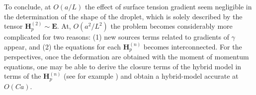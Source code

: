 To conclude, at $O(a/L)$ the effect of surface tension gradient seem negligible in the determination of the shape of the droplet, which is solely described by the tensor $\textbf{H}_p^{(2)}\sim \textbf{E}$. 
At, $O(a^2/L^2)$ the problem becomes considerably more complicated for two reasons: (1) new sources terms related to gradients of $\gamma$ appear, and (2) the equations for each $\textbf{H}_p^{(n)}$ becomes interconnected.  
For the perspectives, once the deformation are obtained with the moment of momentum equations, one may be able to derive the closure terms of the hybrid model in terms of the $\textbf{H}_p^{(n)}$ (see for example \citet{haber1971dynamics}) and obtain a hybrid-model accurate at $O(Ca)$. 


